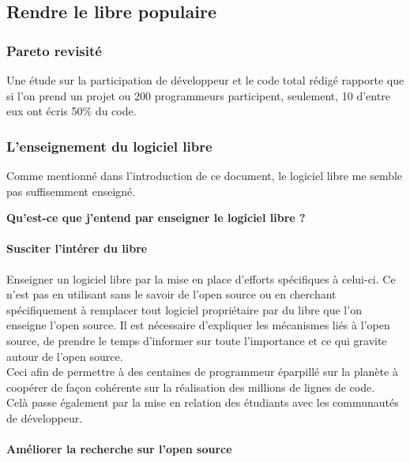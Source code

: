 		\subsection{Rendre le libre populaire}

			\subsubsection{Pareto revisité}
			Une étude sur la participation de développeur et le code total rédigé rapporte que si l'on prend un projet ou 200 programmeurs participent, seulement, 10 d'entre eux ont écris 50\% du code.

			\subsubsection{L'enseignement du logiciel libre}

			Comme mentionné dans l'introduction de ce document, le logiciel libre me semble pas suffisemment enseigné. 

			\textbf{Qu'est-ce que j'entend par enseigner le logiciel libre ?}

			\paragraph{Susciter l'intérer du libre\\}

			Enseigner un logiciel libre par la mise en place d'efforts spécifiques à celui-ci. Ce n'est pas en utilisant sans le savoir de l'open source ou en cherchant spécifiquement à remplacer tout logiciel propriétaire par du libre que l'on enseigne l'open source. Il est nécessaire d'expliquer les mécanismes liés à l'open source, de prendre le temps d'informer sur toute l'importance et ce qui gravite autour de l'open source.\\
			Ceci afin de permettre à des centaines de programmeur éparpillé sur la planète à coopérer de façon cohérente sur la réalisation des millions de lignes de code.\\

			Celà passe également par la mise en relation des étudiants avec les communautés de développeur.

			\paragraph{Améliorer la recherche sur l'open source\\}

